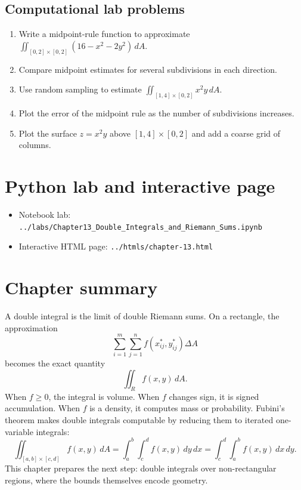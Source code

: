\documentclass[11pt]{article}
\newcommand{\dA}{\,dA}
\newcommand{\dd}{\,d}
\begin{document}
\subsection*{Computational lab problems}
\begin{enumerate}[start=21]
  \item Write a midpoint-rule function to approximate $\iint_{[0,2]\times[0,2]}(16-x^2-2y^2)\dA$.
  \item Compare midpoint estimates for several subdivisions in each direction.
  \item Use random sampling to estimate $\iint_{[1,4]\times[0,2]}x^2y\dA$.
  \item Plot the error of the midpoint rule as the number of subdivisions increases.
  \item Plot the surface $z=x^2y$ above $[1,4]\times[0,2]$ and add a coarse grid of columns.
\end{enumerate}

\section{Python lab and interactive page}

\begin{itemize}
  \item Notebook lab: \texttt{../labs/Chapter13\_Double\_Integrals\_and\_Riemann\_Sums.ipynb}
  \item Interactive HTML page: \texttt{../htmls/chapter-13.html}
\end{itemize}

\section{Chapter summary}

A double integral is the limit of double Riemann sums. On a rectangle, the approximation
\[
\sum_{i=1}^m\sum_{j=1}^n f(x_{ij}^*,y_{ij}^*)\Delta A
\]
becomes the exact quantity
\[
\iint_R f(x,y)\dA.
\]
When $f\ge 0$, the integral is volume. When $f$ changes sign, it is signed accumulation. When $f$ is a density, it computes mass or probability. Fubini's theorem makes double integrals computable by reducing them to iterated one-variable integrals:
\[
\iint_{[a,b]\times[c,d]}f(x,y)\dA
=
\int_a^b\int_c^d f(x,y)\dd y\dd x
=
\int_c^d\int_a^b f(x,y)\dd x\dd y.
\]
This chapter prepares the next step: double integrals over non-rectangular regions, where the bounds themselves encode geometry.
\end{document}
